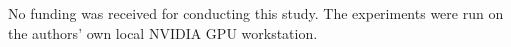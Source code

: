 No funding was received for conducting this study. The experiments were run on the authors' own local NVIDIA GPU workstation.
